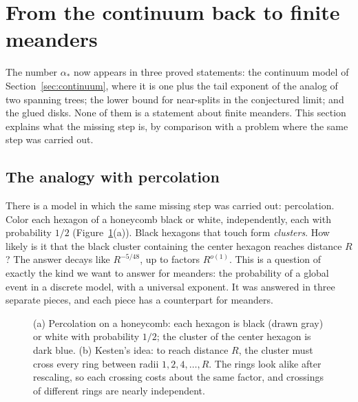 \section{From the continuum back to finite meanders}\label{sec:bridge}

The number $\alpha_*$ now appears in three proved statements: the continuum model of
Section~\ref{sec:continuum}, where it is one plus the tail exponent of the analog of two spanning
trees; the lower bound for near-splits in the conjectured limit; and the glued disks. None of them is a statement about finite meanders. This section explains what the
missing step is, by comparison with a problem where the same step was carried out.

\subsection{The analogy with percolation}

There is a model in which the same missing step was carried out: percolation. Color each hexagon
of a honeycomb black or white, independently, each with probability $1/2$
(Figure~\ref{fig:perc}(a)). Black hexagons that touch form \emph{clusters}. How likely is it that
the black cluster containing the center hexagon reaches distance $R$? The answer decays like
$R^{-5/48}$, up to factors $R^{o(1)}$. This is a question of exactly the kind we want to answer for
meanders: the probability of a global event in a discrete model, with a universal exponent. It
was answered in three separate pieces, and each piece has a counterpart for meanders.

\begin{figure}[ht]
\centering

\caption{(a) Percolation on a honeycomb: each hexagon is black (drawn gray) or white with
probability $1/2$; the cluster of the center hexagon is dark blue. (b) Kesten's idea: to reach
distance $R$, the cluster must cross every ring between radii $1,2,4,\ldots,R$. The rings look
alike after rescaling, so each crossing costs about the same factor, and crossings of different
rings are nearly independent.}
\label{fig:perc}
\end{figure}

